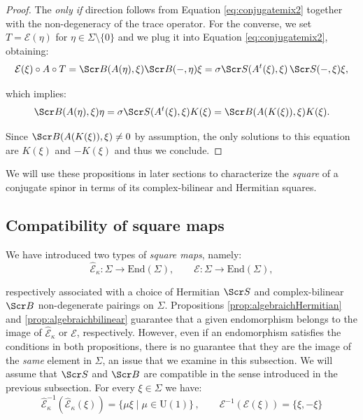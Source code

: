 \documentclass[10pt,a4paper,twoside,reqno]{amsart}
\theoremstyle{plain}
\theoremstyle{definition}
\theoremstyle{remark}
\newcommand{\End}{\mathrm{End}}
\def\scB{\Scr B}
\def\scS{\Scr S}
\def\U{\mathrm{U}}
\def\cE{\mathcal{E}}
\def\hcE{\widehat{\mathcal{E}}}
\begin{document}
\begin{proof}
The \emph{only if} direction follows from Equation \eqref{eq:conjugatemix2} together with the non-degeneracy of the trace operator. For the converse, we set $T = \cE(\eta)$ for $\eta \in \Sigma\setminus \{ 0\}$ and we plug it into Equation \eqref{eq:conjugatemix2}, obtaining:
\begin{equation*}
\cE(\xi) \circ A\circ T = \scB(A(\eta) , \xi) \scB(- , \eta) \xi  =  \sigma  \scS( A^t(\xi) , \xi) \, \scS( - , \xi) \xi,
\end{equation*}

\noindent
which implies:
\begin{equation*}
\scB(A(\eta) , \xi) \eta  = \sigma \scS( A^t(\xi) , \xi)  K(\xi) = \scB(A(K(\xi)) , \xi) K(\xi).
\end{equation*}

\noindent
Since $\scB(A(K(\xi)) , \xi) \neq 0$ by assumption, the only solutions to this equation are  $K(\xi)$ and $ - K(\xi)$ and thus we conclude.  
\end{proof}

\noindent
We will use these propositions in later sections to characterize the \emph{square} of a conjugate spinor in terms of its complex-bilinear and Hermitian squares.


\subsection{Compatibility of square maps}


We have introduced two types of \emph{square maps}, namely:
\begin{equation*}
\hcE_{\kappa}\colon \Sigma \to \End(\Sigma), \qquad \cE\colon \Sigma \to \End(\Sigma),
\end{equation*}

\noindent
respectively associated with a choice of Hermitian $\scS$ and complex-bilinear $\scB$ non-degenerate pairings on $\Sigma$. Propositions \ref{prop:algebraichHermitian} and \ref{prop:algebraichbilinear} guarantee that a given endomorphism belongs to the image of $\hcE_{\kappa}$ or $\cE$, respectively. However, even if an endomorphism satisfies the conditions in both propositions, there is no guarantee that they are the image of the \emph{same} element in $\Sigma$, an issue that we examine in this subsection. We will assume that $\scS$ and $\scB$ are compatible in the sense introduced in the previous subsection. For every $\xi\in\Sigma$ we have:
\begin{equation*}
\hcE_\kappa^{-1}(\hcE_\kappa(\xi)) = \{ \mu \xi \mid \mu\in \U(1) \}\, , \qquad \cE^{-1}(\cE(\xi))= \{ \xi , - \xi\}
\end{equation*}
\end{document}
